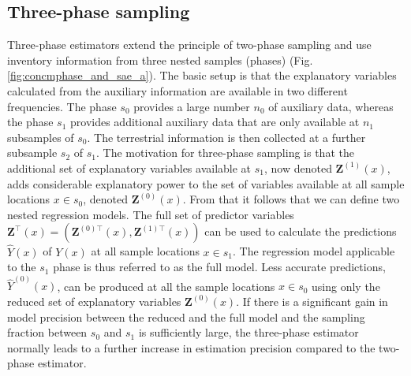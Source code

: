 \subsection{Three-phase sampling}

Three-phase estimators extend the principle of two-phase sampling and use inventory information from three nested samples (phases) (Fig. \ref{fig:concmphase_and_sae_a}). The basic setup is that the explanatory variables calculated from the auxiliary information are available in two different frequencies. The phase $s_0$ provides a large number $n_0$ of auxiliary data, whereas the phase $s_1$ provides additional auxiliary data that are only available at $n_1$ subsamples of $s_0$. The terrestrial information is then collected at a further subsample $s_2$ of $s_1$. The motivation for three-phase sampling is that the additional set of explanatory variables available at $s_1$, now denoted $\pmb{Z}^{(1)}(x)$, adds considerable explanatory power to the set of variables available at all sample locations $x \in s_0$, denoted $\pmb{Z}^{(0)}(x)$. From that it follows that we can define two nested regression models. The full set of predictor variables $\pmb{Z}^{\top}(x)=(\pmb{Z}^{(0){\top}}(x),\pmb{Z}^{(1){\top}}(x))$ can be used to calculate the predictions $\hat{Y}(x)$ of $Y(x)$ at all sample locations $x \in s_1$. The regression model applicable to the $s_1$ phase is thus referred to as the full model. Less accurate predictions, $\hat{Y}^{(0)}(x)$, can be produced at all the sample locations $x \in s_0$ using only the reduced set of explanatory variables $\pmb{Z}^{(0)}(x)$. If there is a significant gain in model precision between the reduced and the full model and the sampling fraction between $s_0$ and $s_1$ is sufficiently large, the three-phase estimator normally leads to a further increase in estimation precision compared to the two-phase estimator. 

